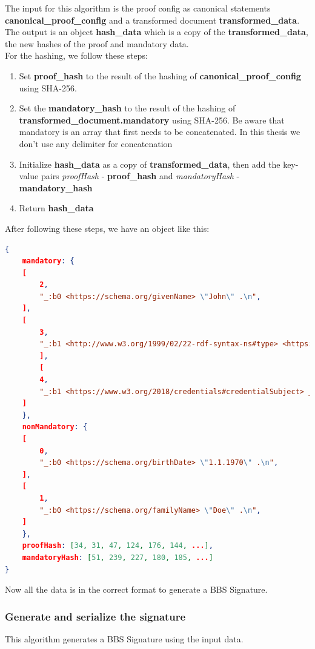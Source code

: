 \documentclass[
	a4paper               %
	,BCOR=0mm            %
	,bibliography=totoc   %
	,listof=totoc         %
	,monolingual
	,twoside=false
]{bfhthesis}              %
\begin{document}
The input for this algorithm is the proof config as canonical statements \\\textbf{canonical\_proof\_config} and a transformed document \textbf{transformed\_data}.\\

The output is an object \textbf{hash\_data} which is a copy of the \textbf{transformed\_data}, the new hashes of the proof and mandatory data.\\

For the hashing, we follow these steps:
\begin{enumerate}
	\item Set \textbf{proof\_hash} to the result of the hashing of \textbf{canonical\_proof\_config} using SHA-256.
	\item Set the \textbf{mandatory\_hash} to the result of the hashing of \\\textbf{transformed\_document.mandatory} using SHA-256. Be aware that mandatory is an array that first needs to be concatenated. In this thesis we don't use any delimiter for concatenation
	\item Initialize \textbf{hash\_data} as a copy of \textbf{transformed\_data}, then add the key-value pairs \textit{proofHash} - \textbf{proof\_hash} and \textit{mandatoryHash} - \textbf{mandatory\_hash}
	\item Return \textbf{hash\_data}
\end{enumerate}

\newpage
After following these steps, we have an object like this:
\begin{lstlisting}[language=json,firstnumber=1,caption={Return object of the VC transformation},captionpos=b]
{
	mandatory: {
	[
		2,
		"_:b0 <https://schema.org/givenName> \"John\" .\n",
	],
	[
		3,
		"_:b1 <http://www.w3.org/1999/02/22-rdf-syntax-ns#type> <https://www.w3.org/2018/credentials#VerifiableCredential> .\n",
		],
		[
		4,
		"_:b1 <https://www.w3.org/2018/credentials#credentialSubject> _:b0 .\n",
	]
	},
	nonMandatory: {
	[
		0,
		"_:b0 <https://schema.org/birthDate> \"1.1.1970\" .\n",
	],
	[
		1,
		"_:b0 <https://schema.org/familyName> \"Doe\" .\n",
	]
	},
	proofHash: [34, 31, 47, 124, 176, 144, ...],
	mandatoryHash: [51, 239, 227, 180, 185, ...]
}
\end{lstlisting}

Now all the data is in the correct format to generate a BBS Signature.

\newpage
\subsubsection{Generate and serialize the signature}
\label{subsec:signvc}
This algorithm generates a BBS Signature using the input data.\\
\end{document}
